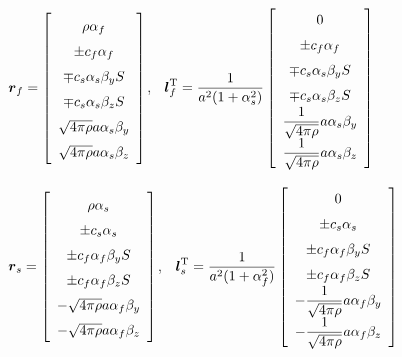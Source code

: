 \begin{center}
$\renewcommand{\arraystretch}{1.5}
\mbox{\boldmath $r$}_{f} =
\left[
\begin{array}{c}
\rho \alpha_{f} \\
\pm c_{f} \alpha_{f} \\
\mp c_{s} \alpha_{s} \beta_{y} S \\
\mp c_{s} \alpha_{s} \beta_{z} S  \\
\sqrt{4\pi\rho} a \alpha_s \beta_y \\
\sqrt{4\pi\rho} a \alpha_s \beta_z \\
\end{array}
\right]$, $\;$
$\renewcommand{\arraystretch}{1.5}
\displaystyle
\mbox{\boldmath $l$}_{f}^{\rm T} =
\frac{1}{a^2 ( 1 + \alpha_s^2 )}
\left[
\begin{array}{c}
0 \\
\pm c_{f} \alpha_{f} \\
\mp c_{s} \alpha_{s} \beta_{y} S \\
\mp c_{s} \alpha_{s} \beta_{z} S  \\
\displaystyle \frac1{\sqrt{4\pi\rho}} a \alpha_s \beta_y \\
\displaystyle \frac1{\sqrt{4\pi\rho}} a \alpha_s \beta_z \\
\end{array}
\right]$ 
\end{center}

\begin{center}
$\renewcommand{\arraystretch}{1.5}
\mbox{\boldmath $r$}_{s} =
\left[
\begin{array}{c}
\rho \alpha_{s} \\
\pm c_{s} \alpha_{s} \\
\pm c_{f} \alpha_{f} \beta_{y} S \\
\pm c_{f} \alpha_{f} \beta_{z} S  \\
- \sqrt{4\pi\rho} a \alpha_f \beta_y \\
- \sqrt{4\pi\rho} a \alpha_f \beta_z \\
\end{array}
\right]$, $\;$
$\renewcommand{\arraystretch}{1.5}
\displaystyle
\mbox{\boldmath $l$}_{s}^{\rm T} =
\frac{1}{a^2 ( 1 + \alpha_f^2 )}
\left[
\begin{array}{c}
0 \\
\pm c_{s} \alpha_{s} \\
\pm c_{f} \alpha_{f} \beta_{y} S \\
\pm c_{f} \alpha_{f} \beta_{z} S  \\
\displaystyle - \frac1{\sqrt{4\pi\rho}} a \alpha_f \beta_y \\
\displaystyle - \frac1{\sqrt{4\pi\rho}} a \alpha_f \beta_z \\
\end{array}
\right]$ 
\end{center}



